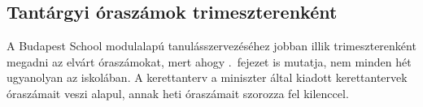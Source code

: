\subsection{Tantárgyi óraszámok trimeszterenként}
A Budapest School modulalapú tanulásszervezéséhez jobban illik trimeszterenként megadni az elvárt óraszámokat, mert ahogy .~fejezet is mutatja, nem minden hét ugyanolyan az iskolában. A kerettanterv a miniszter által kiadott kerettantervek óraszámait veszi alapul, annak heti óraszámait szorozza fel kilenccel. 

\begin{landscape}

\begin{table}[]
\end{table}
\end{landscape}
